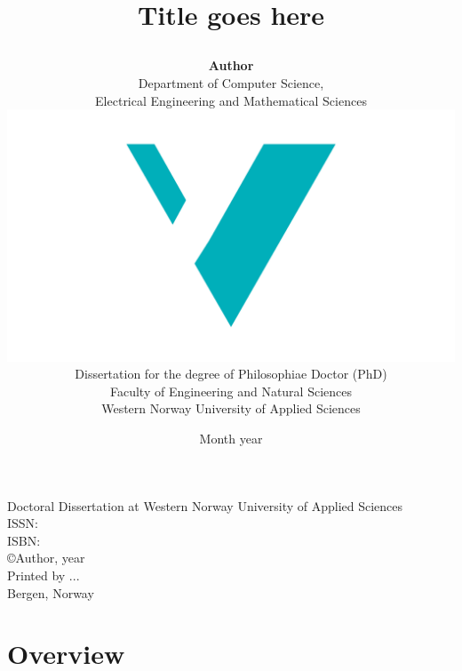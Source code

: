 \documentclass[10pt]{book}
\title{
{\fontsize{28}{30}\usefont{OT1}{phv}{bc}{n}\selectfont Title goes here}
	\author{
	\textbf{Author}\vspace{1cm}\\
		Department of Computer Science, \\ 
		Electrical Engineering and Mathematical Sciences \vspace{1cm}\\
		\includegraphics[scale=0.36]{logos/logo.pdf}\vspace{2em}\\
		Dissertation for the degree of Philosophiae Doctor (PhD)\vspace{0.5em}\\
		Faculty of Engineering and Natural Sciences \vspace{0.3cm}\\
		Western Norway University of Applied Sciences
	}
	\date{Month year}
}
\begin{document}

\ifDownscaledFinalDoc
	\fontsize{\TextSize}{\BaseLineSkip}
	\selectfont
\fi

\ifDraft
	\doublespacing
\fi


\maketitle
\normalsize\vspace*{15cm}
\begin{minipage}{13cm}
Doctoral Dissertation at Western Norway University of Applied Sciences\\
ISSN: \\ %
ISBN: \\[2ex] %
\copyright{Author}, year\\[2ex] %
Printed by ...\\
Bergen, Norway
\end{minipage}

\frontmatter





\tableofcontents
\mainmatter

%
%
\part{Overview}
\label{part:1}



%
%
%


\end{document}
